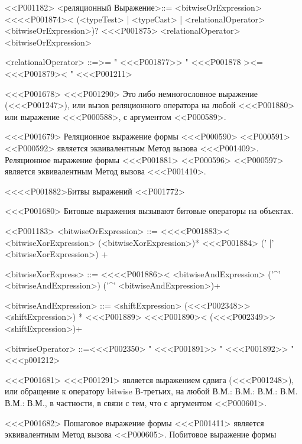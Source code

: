 {{{{{{{{{{{{{{{{{<<P001182>
<реляционный Выражение>::= <bitwiseOrExpression> <<<<P001874><
(<typeTest> | <typeCast> | <relationalOperator> <bitwiseOrExpression>)?
<<<P001875> \SUPER{} <relationalOperator> <bitwiseOrExpression>

<relationalOperator> ::=>= "
<<<P001877>> "
<<<P001878 ><=
<<<P001879>< "
<<<P001211>

<<<P001678>%
<<<P001290> Это либо немногословное выражение
(<<<P001247>),
или вызов реляционного оператора на любой <<<P001880>
или выражение <<<P000588>, с аргументом <<P000589>.

<<<P001679>%
Реляционное выражение формы <<<P000590> <<P000591> <<P000592> является эквивалентным
Метод вызова <<<P001409>.
Реляционное выражение формы <<<P001881> <<P000596> <<P000597> является эквивалентным
Метод вызова <<<P001410>.


<<<<P001882>{Битвы выражений}
<<P001772>

<<<P001680>%
Битовые выражения вызывают битовые операторы на объектах.

<<P001183>
<bitwiseOrExpression> ::= <<<<P001883><
<bitwiseXorExpression> (<bitwiseXorExpression>)*
<<<P001884> \SUPER{} (' |' <bitwiseXorExpression>) +

<bitwiseXorExpress> ::= <<<<P001886><
<bitwiseAndExpression> ('^' <bitwiseAndExpression>)
\alt \SUPER{} ('^' <bitwiseAndExpression>)+

<bitwiseAndExpression> ::= <shiftExpression> (<<<P002348>> <shiftExpression>) *
<<<P001889> <<<P001890>< (<<<P002349>> <shiftExpression>)+

<bitwiseOperator> ::=<<<P002350> "
<<<P001891>> "
<<<P001892>> "
<<<p001212>

<<<P001681>%
<<<P001291> является выражением сдвига (<<<P001248>),
или обращение к оператору bitwise
В-третьих, на любой В.М.: В.М.: В.М.: В.М. В.М.: В.М., в частности, в связи с тем, что
с аргументом <<P000601>.

<<<P001682>%
Пошаговое выражение формы <<<P001411> является эквивалентным
Метод вызова <<P000605>.
Побитовое выражение формы }}}}}}}}}}}}}}}}}
